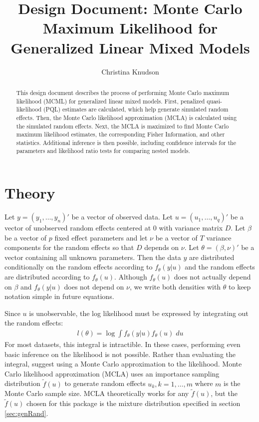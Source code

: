 \documentclass{article}
\title{Design Document: Monte Carlo Maximum Likelihood for Generalized Linear Mixed Models}
\author{Christina Knudson}
\begin{document}
\maketitle{}

\begin{abstract}
This design document describes the process of performing Monte Carlo maximum likelihood (MCML) for generalized linear mixed models.  First, penalized quasi-likelihood (PQL) estimates are calculated, which help generate simulated random effects. Then, the Monte Carlo likelihood approximation (MCLA)  is calculated using the simulated random effects. Next, the MCLA is maximized to find Monte Carlo maximum likelihood estimates, the corresponding Fisher Information, and other statistics. Additional inference is then possible, including confidence intervals for the parameters and likelihood ratio tests for comparing nested models.
\end{abstract}

\section{Theory}

Let $y=(y_1, \ldots, y_n)'$ be a vector of observed data. Let $u=(u_1,\ldots,u_q)'$ be a vector of unobserved random effects centered at 0 with variance matrix $D$. Let $\beta$ be a vector of $p$ fixed effect parameters and let $\nu$ be a vector of $T$ variance components for the random effects so that $D$ depends on $\nu$. Let $\theta=(\beta ,  \nu)'$ be a vector containing all unknown parameters. Then the data $y$ are distributed conditionally on the random effects according to $f_\theta(y|u)$ and the random effects are distributed according to $f_\theta(u)$. Although $f_\theta(u)$ does not actually depend on $\beta$ and $f_\theta(y|u)$ does not depend on $\nu$, we write both densities with $\theta$ to keep notation simple in future equations.

Since $u$ is unobservable, the log likelihood must be expressed by integrating out the random effects:
\begin{align}
l(\theta)=\log \int f_\theta(y|u) f_\theta(u) \; du
\end{align}
For most datasets, this integral is intractible. In these cases, performing even basic inference on the likelihood is not possible. Rather than evaluating the integral, \citet{geyer:thom:1992} suggest using a Monte Carlo approximation to the likelihood. Monte Carlo likelihood approximation (MCLA) uses an importance sampling distribution $\tilde{f}(u)$ to generate random effects $u_k, k=1, \ldots, m$ where $m$ is the Monte Carlo sample size.  MCLA theoretically works for any $\tilde{f}(u)$, but the  $\tilde{f}(u)$ chosen for this package is the mixture distribution specified in section \ref{sec:genRand}.
\end{document}
